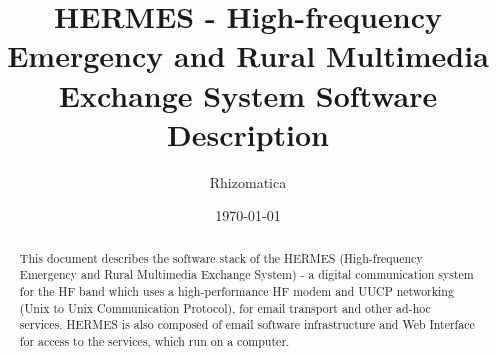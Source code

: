\documentclass[11pt,a4paper]{article}
\title{HERMES - High-frequency Emergency and Rural Multimedia Exchange
  System Software Description}
\author{
       \large
        \mbox{Rhizomatica} \\ %
}
\date{\today}
\begin{document}
\maketitle

\begin{abstract}

This document describes the software stack of the HERMES (High-frequency Emergency and Rural Multimedia Exchange System)
- a digital communication system for the HF band which uses a
high-performance HF modem and UUCP networking (Unix to Unix
Communication Protocol), for email transport and other ad-hoc
services. HERMES is also composed of email software infrastructure and
Web Interface for access to the services, which run on a computer.

\end{abstract}

\newpage

\tableofcontents


\end{document}
